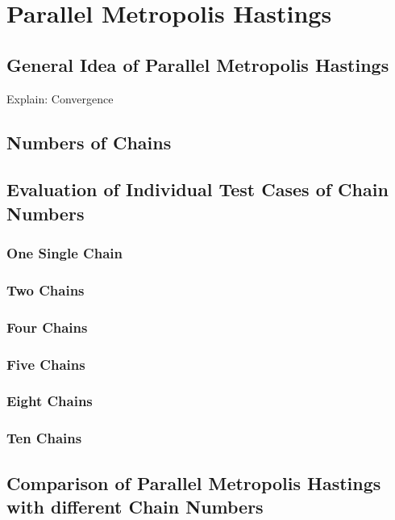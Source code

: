 \chapter{Parallel Metropolis Hastings}

\section{General Idea of Parallel Metropolis Hastings}
Explain: Convergence

\section{Numbers of Chains}

\section{Evaluation of Individual Test Cases of Chain Numbers}
\subsection{One Single Chain}
\subsection{Two Chains}
\subsection{Four Chains}
\subsection{Five Chains}
\subsection{Eight Chains}
\subsection{Ten Chains}


\section{Comparison of Parallel Metropolis Hastings with different Chain Numbers}